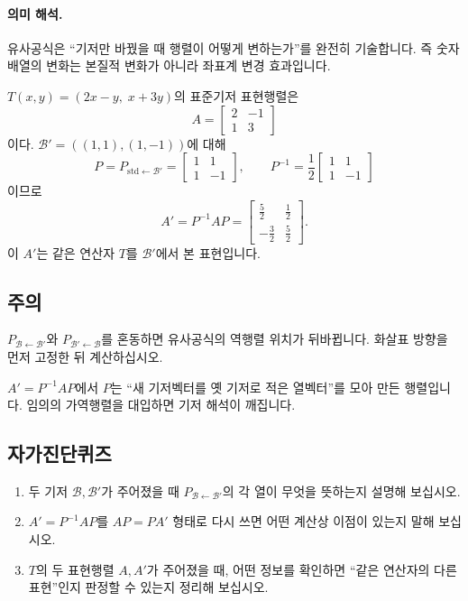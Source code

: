 \paragraph{의미 해석.}
유사공식은 ``기저만 바꿨을 때 행렬이 어떻게 변하는가''를 완전히 기술합니다. 즉 숫자 배열의 변화는 본질적 변화가 아니라 좌표계 변경 효과입니다.

\begin{example}
$T(x,y)=(2x-y,\;x+3y)$의 표준기저 표현행렬은
$$
A=\begin{bmatrix}2&-1\\1&3\end{bmatrix}
$$
이다. $\mathcal B'=((1,1),(1,-1))$에 대해
$$
P=P_{\mathrm{std}\leftarrow\mathcal B'}=
\begin{bmatrix}1&1\\1&-1\end{bmatrix},\qquad
P^{-1}=\frac12\begin{bmatrix}1&1\\1&-1\end{bmatrix}
$$
이므로
$$
A'=P^{-1}AP=
\begin{bmatrix}
\frac52&\frac12\\[2mm]
-\frac32&\frac52
\end{bmatrix}.
$$
이 $A'$는 같은 연산자 $T$를 $\mathcal B'$에서 본 표현입니다.
\end{example}

\subsection*{주의}
\begin{warning}
$P_{\mathcal B\leftarrow\mathcal B'}$와 $P_{\mathcal B'\leftarrow\mathcal B}$를 혼동하면 유사공식의 역행렬 위치가 뒤바뀝니다. 화살표 방향을 먼저 고정한 뒤 계산하십시오.
\end{warning}
\begin{warning}
$A'=P^{-1}AP$에서 $P$는 ``새 기저벡터를 옛 기저로 적은 열벡터''를 모아 만든 행렬입니다. 임의의 가역행렬을 대입하면 기저 해석이 깨집니다.
\end{warning}

\subsection*{자가진단퀴즈}
\begin{enumerate}[label=\arabic*.]
\item 두 기저 $\mathcal B,\mathcal B'$가 주어졌을 때 $P_{\mathcal B\leftarrow\mathcal B'}$의 각 열이 무엇을 뜻하는지 설명해 보십시오.
\item $A' = P^{-1}AP$를 $AP=PA'$ 형태로 다시 쓰면 어떤 계산상 이점이 있는지 말해 보십시오.
\item $T$의 두 표현행렬 $A,A'$가 주어졌을 때, 어떤 정보를 확인하면 ``같은 연산자의 다른 표현''인지 판정할 수 있는지 정리해 보십시오.
\end{enumerate}

